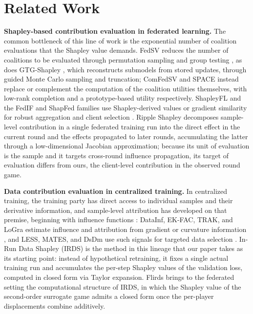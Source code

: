 \documentclass[letterpaper]{article} %
\theoremstyle{definition} %
\begin{document}
\section{Related Work}
\label{sec:related}

\textbf{Shapley-based contribution evaluation in federated learning.}
The common bottleneck of this line of work is the exponential number of
coalition evaluations that the Shapley value demands. FedSV
\citep{wang2020principled} reduces the number of coalitions to be evaluated
through permutation sampling and group testing
\citep{castro2009polynomial,jia2019towards}, as does GTG-Shapley
\citep{liu2022gtg}, which reconstructs submodels from stored updates, through
guided Monte Carlo sampling and truncation; ComFedSV
\citep{fan2022improving} and SPACE \citep{chen2023space} instead replace or
complement the computation of the coalition utilities themselves, with
low-rank completion and a prototype-based utility respectively. ShapleyFL and
the FedIF and ShapFed families use Shapley-derived values or gradient
similarity for robust aggregation and client selection
\citep{sun2023shapleyfl,tang2025lightweight,tastan2024redefining}. Ripple
Shapley \citep{zeng2026ripple} decomposes sample-level contribution in a
single federated training run into the direct effect in the current round and
the effects propagated to later rounds, accumulating the latter through a
low-dimensional Jacobian approximation; because its unit of evaluation is the
sample and it targets cross-round influence propagation, its target of
evaluation differs from ours, the client-level contribution in the observed
round game.

\textbf{Data contribution evaluation in centralized training.}
In centralized training, the training party has direct access to individual
samples and their derivative information, and sample-level attribution has
developed on that premise, beginning with influence functions
\citep{koh2017understanding}: DataInf, EK-FAC, TRAK, and LoGra estimate
influence and attribution from gradient or curvature information
\citep{kwon2024datainf,grosse2023studying,park2023trak,choe2026your}, and
LESS, MATES, and DsDm use such signals for targeted data selection
\citep{xia2024less,yu2024mates,engstrom2024dsdm}. In-Run Data Shapley (IRDS)
\citep{wang2025data} is the method in this lineage that our paper takes as
its starting point: instead of hypothetical retraining, it fixes a single
actual training run and accumulates the per-step Shapley values of the
validation loss, computed in closed form via Taylor expansion. Flirds brings
to the federated setting the computational structure of IRDS, in which the
Shapley value of the second-order surrogate game admits a closed form once
the per-player displacements combine additively.
\end{document}

